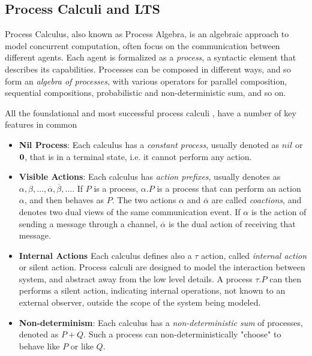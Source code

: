 \subsection{Process Calculi and LTS}


Process Calculus, also known as Process Algebra, is an algebraic approach to model concurrent computation, often focus on the communication between different agents. Each agent is formalized as a \textit{process}, a syntactic element that describes its capabilities. Processes can be composed in different ways, and so form an \textit{algebra of processes}, with various operators for parallel composition, sequential compositions, probabilistic and non-deterministic sum, and so on.

All the foundational and most successful process calculi \cite{milnerCalculusCommunicatingSystems1980, bergstraAlgebraCommunicatingProcesses1985, 
hoareCommunicatingSequentialProcesses1978, milnerCommunicatingMobileSystems1999},  have a number of key features in common \begin{itemize}
\item \textbf{Nil Process}: Each calculus has a \textit{constant process}, usually denoted as $nil$ or $\mathbf{0}$, that is in a terminal state, i.e. it cannot perform any action.
\item \textbf{Visible Actions}: Each calculus has \textit{action prefixes}, usually denotes as $\alpha, \beta, \ldots, \overline{\alpha}, \overline{\beta}, \ldots$. If $P$ is a process, $\alpha.P$ is a process that can perform an action $\alpha$, and then behaves as $P$. The two actions $\alpha$ and $\overline{\alpha}$ are called \textit{coactions}, and denotes two dual views of the same communication event. If $\alpha$ is the action of sending a message through a channel, $\overline{\alpha}$ is the dual action of receiving that message. 
\item \textbf{Internal Actions} Each calculus defines also a $\tau$ action, called \textit{internal action} or silent action. Process calculi are designed to model the interaction between system, and abstract away from the low level details. A process $\tau.P$ can then performs a silent action, indicating internal operations, not known to an external observer, outside the scope of the system being modeled. 
\item \textbf{Non-determinism}: Each calculus has a \textit{non-deterministic sum} of processes, denoted as $P + Q$. Such a process can non-deterministically "choose" to behave like $P$ or like $Q$. 

\end{itemize}

